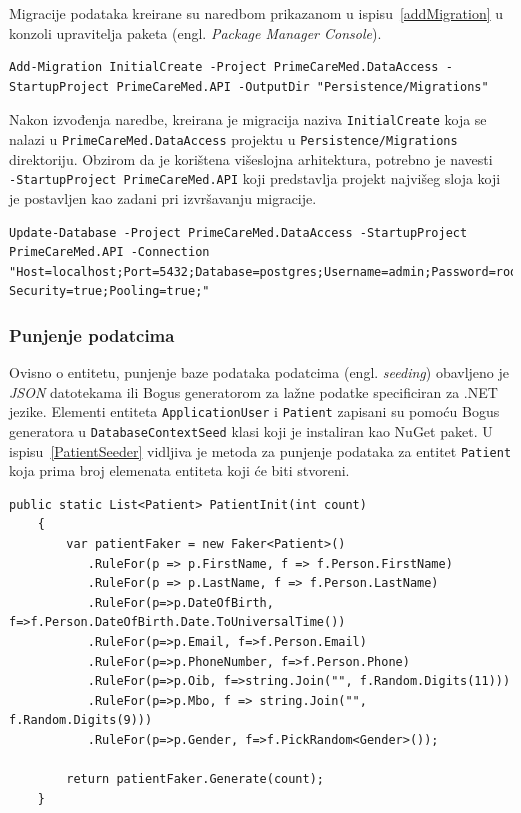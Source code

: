 Migracije podataka kreirane su naredbom prikazanom u ispisu~\ref{addMigration} u konzoli upravitelja paketa (engl. \textit{Package Manager Console}). 

\begin{lstlisting}[caption={Naredba za kreiranje migracije}, label=addMigration]
Add-Migration InitialCreate -Project PrimeCareMed.DataAccess -StartupProject PrimeCareMed.API -OutputDir "Persistence/Migrations"
\end{lstlisting}

Nakon izvođenja naredbe, kreirana je migracija naziva \texttt{InitialCreate} koja se nalazi u \texttt{PrimeCareMed.DataAccess} projektu u \texttt{Persistence/Migrations} direktoriju. Obzirom da je korištena višeslojna arhitektura, potrebno je navesti\\\texttt{-StartupProject PrimeCareMed.API} koji predstavlja projekt najvišeg sloja koji je postavljen kao zadani pri izvršavanju migracije.

\begin{lstlisting}[caption={Primjena migracije na bazu podataka}, label=updateDatabase]
Update-Database -Project PrimeCareMed.DataAccess -StartupProject PrimeCareMed.API -Connection "Host=localhost;Port=5432;Database=postgres;Username=admin;Password=root;Integrated Security=true;Pooling=true;"
\end{lstlisting}

\subsubsection{Punjenje podatcima}
Ovisno o entitetu, punjenje baze podataka podatcima (engl. \textit{seeding}) obavljeno je \textit{JSON} datotekama ili Bogus generatorom za lažne podatke specificiran za .NET jezike. Elementi entiteta \texttt{ApplicationUser} i \texttt{Patient} zapisani su pomoću Bogus generatora u \texttt{DatabaseContextSeed} klasi koji je instaliran kao NuGet paket. U ispisu~\ref{PatientSeeder} vidljiva je metoda za punjenje podataka za entitet \texttt{Patient} koja prima broj elemenata entiteta koji će biti stvoreni.  \cite{bogus1}

\begin{lstlisting}[caption={\texttt{PatientInit} metoda za punjenje lažnih podataka}, label=PatientSeeder]
    public static List<Patient> PatientInit(int count)
    {
        var patientFaker = new Faker<Patient>()
           .RuleFor(p => p.FirstName, f => f.Person.FirstName)
           .RuleFor(p => p.LastName, f => f.Person.LastName)
           .RuleFor(p=>p.DateOfBirth, f=>f.Person.DateOfBirth.Date.ToUniversalTime())
           .RuleFor(p=>p.Email, f=>f.Person.Email)
           .RuleFor(p=>p.PhoneNumber, f=>f.Person.Phone)
           .RuleFor(p=>p.Oib, f=>string.Join("", f.Random.Digits(11)))
           .RuleFor(p=>p.Mbo, f => string.Join("", f.Random.Digits(9)))
           .RuleFor(p=>p.Gender, f=>f.PickRandom<Gender>());

        return patientFaker.Generate(count);
    }
\end{lstlisting}

